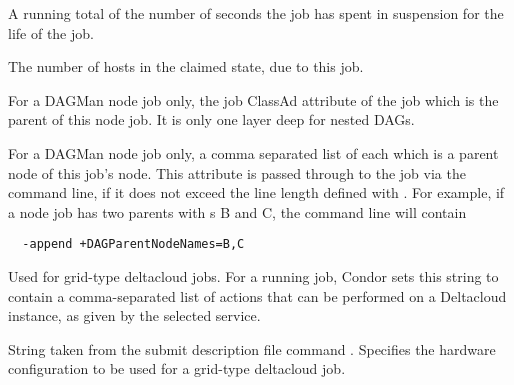 \begin{description}
\item[\AdAttr{CumulativeSuspensionTime}:]  A running total of the number of
seconds the job has spent in suspension for the life of the job.

\item[\AdAttr{CurrentHosts}:]  The number of hosts in the claimed state,
due to this job.

\item[\AdAttr{DAGManJobId}:] For a DAGMan node job only,
the  job ClassAd attribute
of the  job which is the parent of this node job.
It is only one layer deep for nested DAGs.

\item[\AdAttr{DAGParentNodeNames}:] For a DAGMan node job only,
a comma separated list of each  which is a parent node of
this job's node.
This attribute is passed through to the job via the 
command line, if it does not exceed the line length defined with
. For example, if a node job has two parents
with s B and C, the  command line will 
contain
\begin{verbatim}
  -append +DAGParentNodeNames=B,C
\end{verbatim}

\item[\AdAttr{DeltacloudAvailableActions}:] 
Used for grid-type deltacloud jobs.
For a running job,
Condor sets this string to contain a comma-separated list of actions
that can be performed on a Deltacloud instance, 
as given by the selected service.

\item[\AdAttr{DeltacloudHardwareProfile}:] 
String taken from the submit description file command
. Specifies the
hardware configuration to be used for a grid-type deltacloud
job.


\end{description}
